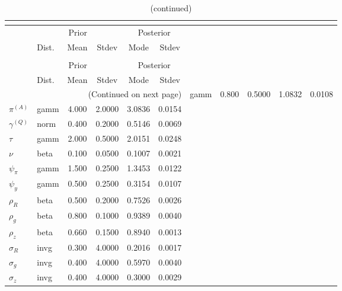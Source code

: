 
\begin{center}
\begin{longtable}{llcccc} 
\caption{Results from posterior maximization (parameters)}\\
 \label{Table:Posterior:1}\\
\toprule 
  & \multicolumn{3}{c}{Prior}  &  \multicolumn{2}{c}{Posterior} \\
  \cmidrule(r{.75em}){2-4} \cmidrule(r{.75em}){5-6}
  & Dist. & Mean  & Stdev & Mode & Stdev \\ 
\midrule \endfirsthead 
\caption{(continued)}\\
 \bottomrule 
  & \multicolumn{3}{c}{Prior}  &  \multicolumn{2}{c}{Posterior} \\
  \cmidrule(r{.75em}){2-4} \cmidrule(r{.75em}){5-6}
  & Dist. & Mean  & Stdev & Mode & Stdev \\ 
\midrule \endhead 
\bottomrule \multicolumn{6}{r}{(Continued on next page)}\endfoot 
\bottomrule\endlastfoot 
${r_{A}}$ & gamm &   0.800 & 0.5000 &   1.0832 &  0.0108 \\ 
${\pi^{(A)}}$ & gamm &   4.000 & 2.0000 &   3.0836 &  0.0154 \\ 
${\gamma^{(Q)}}$ & norm &   0.400 & 0.2000 &   0.5146 &  0.0069 \\ 
${\tau}$ & gamm &   2.000 & 0.5000 &   2.0151 &  0.0248 \\ 
${\nu}$ & beta &   0.100 & 0.0500 &   0.1007 &  0.0021 \\ 
${\psi_\pi}$ & gamm &   1.500 & 0.2500 &   1.3453 &  0.0122 \\ 
${\psi_y}$ & gamm &   0.500 & 0.2500 &   0.3154 &  0.0107 \\ 
${\rho_R}$ & beta &   0.500 & 0.2000 &   0.7526 &  0.0026 \\ 
${\rho_{g}}$ & beta &   0.800 & 0.1000 &   0.9389 &  0.0040 \\ 
${\rho_z}$ & beta &   0.660 & 0.1500 &   0.8940 &  0.0013 \\ 
${\sigma_R}$ & invg &   0.300 & 4.0000 &   0.2016 &  0.0017 \\ 
${\sigma_{g}}$ & invg &   0.400 & 4.0000 &   0.5970 &  0.0040 \\ 
${\sigma_z}$ & invg &   0.400 & 4.0000 &   0.3000 &  0.0029 \\ 
\end{longtable}
 \end{center}
